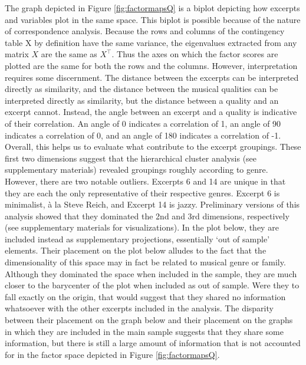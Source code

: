 \documentclass[
  english,
  man,floatsintext]{apa6}
\begin{document}
The graph depicted in Figure \ref{fig:factormapsQ} is a biplot depicting how excerpts and variables plot in the same space. This biplot is possible because of the nature of correspondence analysis. Because the rows and columns of the contingency table X by definition have the same variance, the eigenvalues extracted from any matrix \(\textit{X}\) are the same as \(\textit{X}^\top\). Thus the axes on which the factor scores are plotted are the same for both the rows and the columns. However, interpretation requires some discernment. The distance between the excerpts can be interpreted directly as similarity, and the distance between the musical qualities can be interpreted directly as similarity, but the distance between a quality and an excerpt cannot. Instead, the angle between an excerpt and a quality is indicative of their correlation. An angle of 0 indicates a correlation of 1, an angle of 90 indicates a correlation of 0, and an angle of 180 indicates a correlation of -1.\\
Overall, this helps us to evaluate what contribute to the excerpt groupings. These first two dimensions suggest that the hierarchical cluster analysis (see supplementary materials) revealed groupings roughly according to genre. However, there are two notable outliers. Excerpts 6 and 14 are unique in that they are each the only representative of their respective genres. Excerpt 6 is minimalist, à la Steve Reich, and Excerpt 14 is jazzy. Preliminary versions of this analysis showed that they dominated the 2nd and 3rd dimensions, respectively (see supplementary materials for visualizations). In the plot below, they are included instead as supplementary projections, essentially `out of sample' elements. Their placement on the plot below alludes to the fact that the dimensionality of this space may in fact be related to musical genre or family. Although they dominated the space when included in the sample, they are much closer to the barycenter of the plot when included as out of sample. Were they to fall exactly on the origin, that would suggest that they shared no information whatsoever with the other excerpts included in the analysis. The disparity between their placement on the graph below and their placement on the graphs in which they are included in the main sample suggests that they share some information, but there is still a large amount of information that is not accounted for in the factor space depicted in Figure \ref{fig:factormapsQ}.\\
\end{document}
